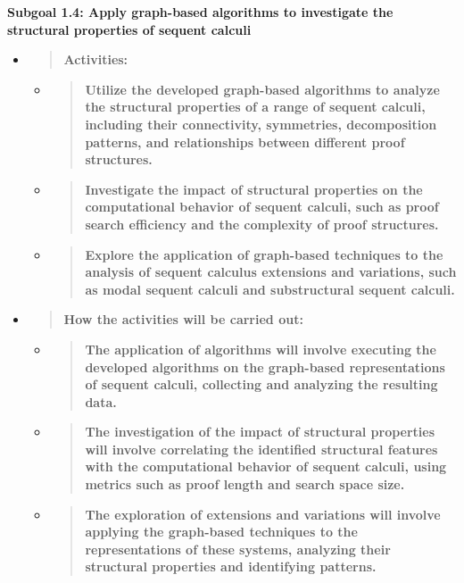 \textbf{Subgoal 1.4: Apply graph-based algorithms to investigate the
structural properties of sequent calculi}

\begin{itemize}
\item
  \begin{quote}
  \textbf{Activities:\\
  }
  \end{quote}

  \begin{itemize}
  \item
    \begin{quote}
    \textbf{Utilize the developed graph-based algorithms to analyze the
    structural properties of a range of sequent calculi, including their
    connectivity, symmetries, decomposition patterns, and relationships
    between different proof structures.}
    \end{quote}
  \item
    \begin{quote}
    \textbf{Investigate the impact of structural properties on the
    computational behavior of sequent calculi, such as proof search
    efficiency and the complexity of proof structures.}
    \end{quote}
  \item
    \begin{quote}
    \textbf{Explore the application of graph-based techniques to the
    analysis of sequent calculus extensions and variations, such as
    modal sequent calculi and substructural sequent calculi.}
    \end{quote}
  \end{itemize}
\item
  \begin{quote}
  \textbf{How the activities will be carried out:\\
  }
  \end{quote}

  \begin{itemize}
  \item
    \begin{quote}
    \textbf{The application of algorithms will involve executing the
    developed algorithms on the graph-based representations of sequent
    calculi, collecting and analyzing the resulting data.}
    \end{quote}
  \item
    \begin{quote}
    \textbf{The investigation of the impact of structural properties
    will involve correlating the identified structural features with the
    computational behavior of sequent calculi, using metrics such as
    proof length and search space size.}
    \end{quote}
  \item
    \begin{quote}
    \textbf{The exploration of extensions and variations will involve
    applying the graph-based techniques to the representations of these
    systems, analyzing their structural properties and identifying
    patterns.}
    \end{quote}
  \end{itemize}
\end{itemize}

